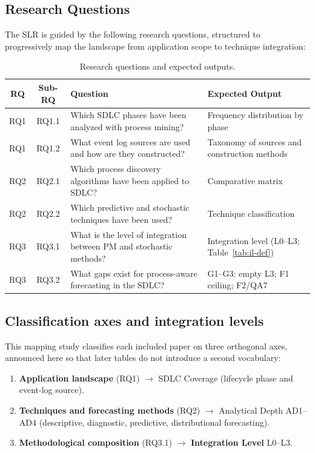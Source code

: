 \subsection{Research Questions}
\label{sec:slr-rqs}

The SLR is guided by the following research questions, structured to
progressively map the landscape from application scope to technique
integration:

\begin{table}[htbp]
\centering
\caption{Research questions and expected outputs.}
\label{tab:slr-rqs}
\small
\setlength{\tabcolsep}{4pt}
\begin{tabular}{c c p{7.1cm} p{3.8cm}}
\toprule
\textbf{RQ} & \textbf{Sub-RQ} & \textbf{Question} & \textbf{Expected Output} \\
\midrule
RQ1 & RQ1.1 & Which SDLC phases have been analyzed with process mining? &
  Frequency distribution by phase \\
RQ1 & RQ1.2 & What event log sources are used and how are they constructed? &
  Taxonomy of sources and construction methods \\
\midrule
RQ2 & RQ2.1 & Which process discovery algorithms have been applied to SDLC? &
  Comparative matrix \\
RQ2 & RQ2.2 & Which predictive and stochastic techniques have been used? &
  Technique classification \\
\midrule
RQ3 & RQ3.1 & What is the level of integration between PM and stochastic
  methods? & Integration level (L0--L3; Table~\ref{tab:il-def}) \\
RQ3 & RQ3.2 & What gaps exist for process-aware forecasting in the SDLC? &
  G1--G3: empty L3; F1 ceiling; F2/QA7 \\
\bottomrule
\end{tabular}
\end{table}

\subsection{Classification axes and integration levels}
\label{sec:slr-il-def}

This mapping study classifies each included paper on three orthogonal axes,
announced here so that later tables do not introduce a second vocabulary:

\begin{enumerate}
\item \textbf{Application landscape} (RQ1) $\rightarrow$ SDLC Coverage
  (lifecycle phase and event-log source).
\item \textbf{Techniques and forecasting methods} (RQ2) $\rightarrow$
  Analytical Depth AD1--AD4 (descriptive, diagnostic, predictive,
  distributional forecasting).
\item \textbf{Methodological composition} (RQ3.1) $\rightarrow$
  \textbf{Integration Level} L0--L3.
\end{enumerate}

